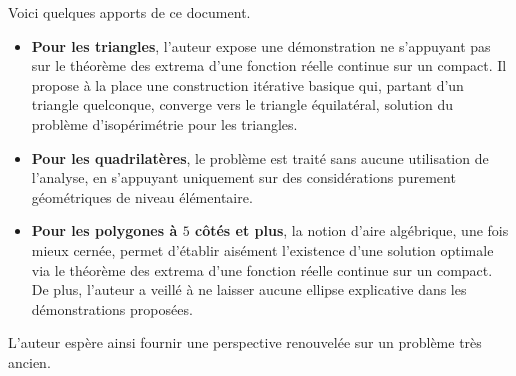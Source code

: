 Voici quelques apports de ce document.

\begin{itemize}
    \item \textbf{Pour les triangles}, l'auteur expose une démonstration ne s'appuyant pas sur le théorème des extrema d'une fonction réelle continue sur un compact. 
    Il propose à la place une construction itérative basique qui, partant d'un triangle quelconque, converge vers le triangle équilatéral, solution du problème d'isopérimétrie pour les triangles.
    
    \item \textbf{Pour les quadrilatères}, le problème est traité sans aucune utilisation de l'analyse, en s'appuyant uniquement sur des considérations purement géométriques de niveau élémentaire.

    \item \textbf{\boldmath Pour les polygones à $5$ côtés et plus}, la notion d'aire algébrique, une fois mieux cernée, permet d'établir aisément l'existence d'une solution optimale via le théorème des extrema d'une fonction réelle continue sur un compact.
    De plus, l'auteur a veillé à ne laisser aucune ellipse explicative dans les démonstrations proposées.
\end{itemize}

L'auteur espère ainsi fournir une perspective renouvelée sur un problème très ancien.
